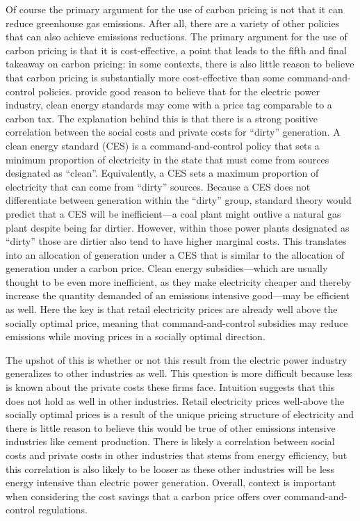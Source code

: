 Of course the primary argument for the use of carbon pricing is not that it can reduce greenhouse gas emissions. After all, there are a variety of other policies that can also achieve emissions reductions. The primary argument for the use of carbon pricing is that it is cost-effective, a point that leads to the fifth and final takeaway on carbon pricing: in some contexts, there is also little reason to believe that carbon pricing is substantially more cost-effective than some command-and-control policies. \cite{borenstein2022carbon} provide good reason to believe that for the electric power industry, clean energy standards may come with a price tag comparable to a carbon tax. The explanation behind this is that there is a strong positive correlation between the social costs and private costs for ``dirty'' generation. A clean energy standard (CES) is a command-and-control policy that sets a minimum proportion of electricity in the state that must come from sources designated as ``clean''. Equivalently, a CES sets a maximum proportion of electricity that can come from ``dirty'' sources. Because a CES does not differentiate between generation within the ``dirty'' group, standard theory would predict that a CES will be inefficient---a coal plant might outlive a natural gas plant despite being far dirtier. However, within those power plants designated as ``dirty'' those are dirtier also tend to have higher marginal costs. This translates into an allocation of generation under a CES that is similar to the allocation of generation under a carbon price. Clean energy subsidies---which are usually thought to be even more inefficient, as they make electricity cheaper and thereby increase the quantity demanded of an emissions intensive good---may be efficient as well. Here the key is that retail electricity prices are already well above the socially optimal price, meaning that command-and-control subsidies may reduce emissions while moving prices in a socially optimal direction. 

The upshot of this is whether or not this result from the electric power industry generalizes to other industries as well. This question is more difficult because less is known about the private costs these firms face. Intuition suggests that this does not hold as well in other industries. Retail electricity prices well-above the socially optimal prices is a result of the unique pricing structure of electricity and there is little reason to believe this would be true of other emissions intensive industries like cement production. There is likely a correlation between social costs and private costs in other industries that stems from energy efficiency, but this correlation is also likely to be looser as these other industries will be less energy intensive than electric power generation. Overall, context is important when considering the cost savings that a carbon price offers over command-and-control regulations. 


